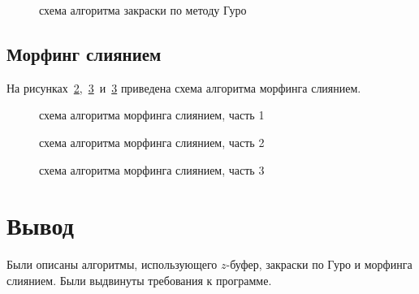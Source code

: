 \begin{figure}[h]
	\centering
	
	\caption{схема алгоритма закраски по методу Гуро}
	\label{fig:guro}
\end{figure}

\clearpage

\subsection{Морфинг слиянием}

На рисунках~\ref{fig:morph1},~\ref{fig:morph2}~и~\ref{fig:morph2} приведена схема алгоритма морфинга слиянием.

\begin{figure}[h]
	\centering
	
	\caption{схема алгоритма морфинга слиянием, часть 1}
	\label{fig:morph1}
\end{figure}

\begin{figure}[h]
	\centering
	
	\caption{схема алгоритма морфинга слиянием, часть 2}
	\label{fig:morph2}
\end{figure}

\clearpage

\begin{figure}[h]
	\centering
	
	\caption{схема алгоритма морфинга слиянием, часть 3}
	\label{fig:morph3}
\end{figure}

\section*{Вывод}
Были описаны алгоритмы, использующего $z$-буфер, закраски по Гуро и морфинга слиянием. Были выдвинуты требования к программе.